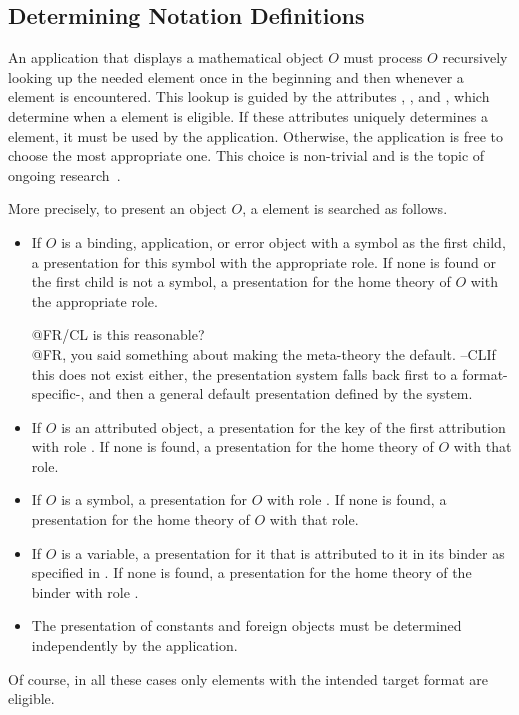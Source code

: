 \documentclass[a4paper]{article}
\begin{document}
\subsection{Determining Notation Definitions}\label{sec:determining}

An application that displays a mathematical object $O$ must process $O$ recursively
looking up the needed {} element once in the beginning and then
whenever a {} element is encountered. This lookup is guided by the
attributes {}, {}, and
{}, which determine when a {}
element is eligible. If these attributes uniquely determines a {}
element, it must be used by the application. Otherwise, the application is free to choose
the most appropriate one. This choice is non-trivial and is the topic of ongoing
research~\cite{KohMueMue:dfncimk07}.

More precisely, to present an object $O$, a {} element is searched
as follows.
\begin{itemize}
\item If $O$ is a binding, application, or error object with a symbol as the first child,
  a presentation for this symbol with the appropriate role. If none is found or the first
  child is not a symbol, a presentation for the home theory of $O$ with the appropriate
  role. \begin{newpart}{@FR/CL is this reasonable?\\
      @FR, you said something about making the meta-theory {\omdoc} the default. --CL}If
    this does not exist either, the presentation system falls back first to a
    format-specific-, and then a general default presentation defined by the
    system.\end{newpart}
\item If $O$ is an attributed object, a presentation for the key of the first attribution
  with role {}. If none is found, a presentation for the
  home theory of $O$ with that role.
\item If $O$ is a symbol, a presentation for $O$ with role
  {}. If none is found, a presentation for the home
  theory of $O$ with that role.
\item If $O$ is a variable, a presentation for it that is attributed to it in its binder
  as specified in {}. If none is found, a presentation for the home theory of
  the binder with role {}.
\item The presentation of constants and foreign objects must be determined independently
  by the application.
\end{itemize}
Of course, in all these cases only {} elements with the intended
target format are eligible.
\end{document}
